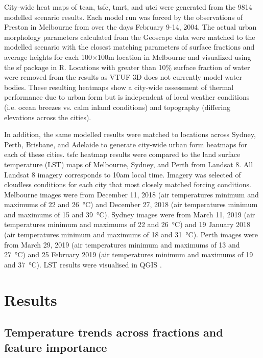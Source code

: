 \documentclass[final,3p,times,authoryear]{elsarticle}
\begin{document}
City-wide heat maps of \gls{tcan}, \gls{tsfc}, \gls{tmrt}, and \gls{utci} were generated from the 9814 modelled scenario results. Each model run was forced by the observations of Preston in Melbourne from \cite{Coutts2007} over the days February 9-14, 2004. The actual urban morphology parameters calculated from the Geoscape data were matched to the modelled scenario with the closest matching parameters of surface fractions and average heights for each 100$\times$100m location in Melbourne and visualized using the sf package \citep{Pebesma2018} in R. Locations with greater than 10\% surface fraction of water were removed from the results as VTUF-3D does not currently model water bodies. These resulting heatmaps show a city-wide assessment of thermal performance due to urban form but is independent of local weather conditions (i.e. ocean breezes vs. calm inland conditions) and topography (differing elevations across the cities). 

In addition, the same modelled results were matched to locations across Sydney, Perth, Brisbane, and Adelaide to generate city-wide urban form heatmaps for each of these cities.  \gls{tsfc} heatmap results were compared to the land surface temperature (LST) maps of Melbourne, Sydney, and Perth from Landsat 8. All Landsat 8 imagery corresponds to 10am local time. Imagery was selected of cloudless conditions for each city that most closely matched forcing conditions. Melbourne images were from December 11, 2018  (air temperatures minimum and maximums of 22 and 26\SI{}{\degreeCelsius}) and December 27, 2018  (air temperatures minimum and maximums of 15 and 39\SI{}{\degreeCelsius}). Sydney images were from March 11, 2019  (air temperatures minimum and maximums of 22 and 26\SI{}{\degreeCelsius}) and 19 January 2018  (air temperatures minimum and maximums of 18 and 31\SI{}{\degreeCelsius}). Perth images were from March 29, 2019  (air temperatures minimum and maximums of 13 and 27\SI{}{\degreeCelsius}) and 25 February 2019  (air temperatures minimum and maximums of 19 and 37\SI{}{\degreeCelsius}). LST results were visualised in QGIS \citep{QGIS2009}.


\section{Results}\label{sec:results}

\subsection{Temperature trends across fractions and feature importance}\label{sec:resulttrends}
\end{document}
